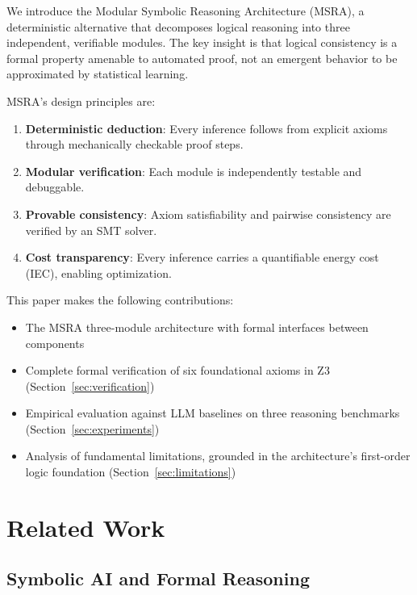 \documentclass[11pt,a4paper]{article}
\begin{document}
We introduce the Modular Symbolic Reasoning Architecture (MSRA), a deterministic alternative that decomposes logical reasoning into three independent, verifiable modules. The key insight is that logical consistency is a formal property amenable to automated proof, not an emergent behavior to be approximated by statistical learning.

MSRA's design principles are:

\begin{enumerate}
    \item \textbf{Deterministic deduction}: Every inference follows from explicit axioms through mechanically checkable proof steps.
    \item \textbf{Modular verification}: Each module is independently testable and debuggable.
    \item \textbf{Provable consistency}: Axiom satisfiability and pairwise consistency are verified by an SMT solver.
    \item \textbf{Cost transparency}: Every inference carries a quantifiable energy cost (IEC), enabling optimization.
\end{enumerate}

This paper makes the following contributions:
\begin{itemize}
    \item The MSRA three-module architecture with formal interfaces between components
    \item Complete formal verification of six foundational axioms in Z3 (Section~\ref{sec:verification})
    \item Empirical evaluation against LLM baselines on three reasoning benchmarks (Section~\ref{sec:experiments})
    \item Analysis of fundamental limitations, grounded in the architecture's first-order logic foundation (Section~\ref{sec:limitations})
\end{itemize}

\section{Related Work}\label{sec:related}

\subsection{Symbolic AI and Formal Reasoning}
\end{document}
